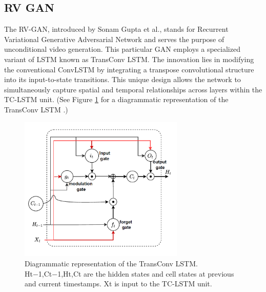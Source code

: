 \documentclass[12pt,twoside,a4paper,parskip]{scrbook} %
\begin{document}
\subsection{RV GAN}
The RV-GAN, introduced by Sonam Gupta et al., \cite{rvgan}stands for Recurrent Variational Generative Adversarial Network and serves the purpose of unconditional video generation. This particular GAN employs a specialized variant of LSTM known as TransConv LSTM. The innovation lies in modifying the conventional ConvLSTM by integrating a transpose convolutional structure into its input-to-state transitions. This unique design allows the network to simultaneously capture spatial and temporal relationships across layers within the TC-LSTM unit. (See Figure \ref{fig:transconv} for a diagrammatic representation of the TransConv LSTM \cite{rvgan}.)

\begin{figure}[H]
    \centering
    \includegraphics[width=0.70\textwidth]{Images/transconv.png}
    \caption[ Diagrammatic representation of the TransConv LSTM]{Diagrammatic representation of the TransConv LSTM. Ht−1,Ct−1,Ht,Ct are the hidden states and cell states at previous and current timestamps. Xt is input to the TC-LSTM unit.\cite{rvgan}}
    \label{fig:transconv}
  \end{figure}
\end{document}
